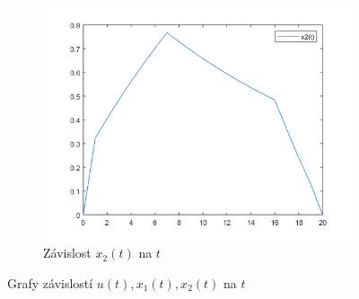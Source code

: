 \documentclass[12pt]{article}
\begin{document}
\begin{figure}[h!]
\begin{subfigure}[b]{0.5\linewidth}
            \includegraphics[width=\linewidth]{x2_t.png}
            \caption{Závislost $x_{2}(t)$ na $t$}
        \end{subfigure}
        \caption{Grafy závislostí $u(t), x_1(t), x_2(t)$ na $t$}
    \end{figure}
\end{document}
